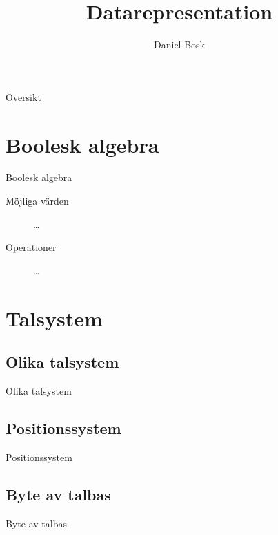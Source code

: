 \documentclass{beamer}
\title[Introduktion]{%
	Datarepresentation
}
\author{Daniel Bosk}
\institute[MIUN ITM]{%
	Institutionen för informationsteknologi och medier (ITM),\\
	Mittuniversitetet, Sundsvall.
}
\date{\svnId}
\begin{document}
\begin{frame}
  \titlepage
\end{frame}

\begin{frame}{Översikt}
	\tableofcontents
\end{frame}





\section{Boolesk algebra}

\begin{frame}{Boolesk algebra}
	\begin{description}
		\item[Möjliga värden] \dots
		\item[Operationer] \dots
	\end{description}
\end{frame}


\section{Talsystem}

\subsection{Olika talsystem}
\begin{frame}{Olika talsystem}
\end{frame}

\subsection{Positionssystem}
\begin{frame}{Positionssystem}
\end{frame}

\subsection{Byte av talbas}
\begin{frame}{Byte av talbas}
\end{frame}
\end{document}
